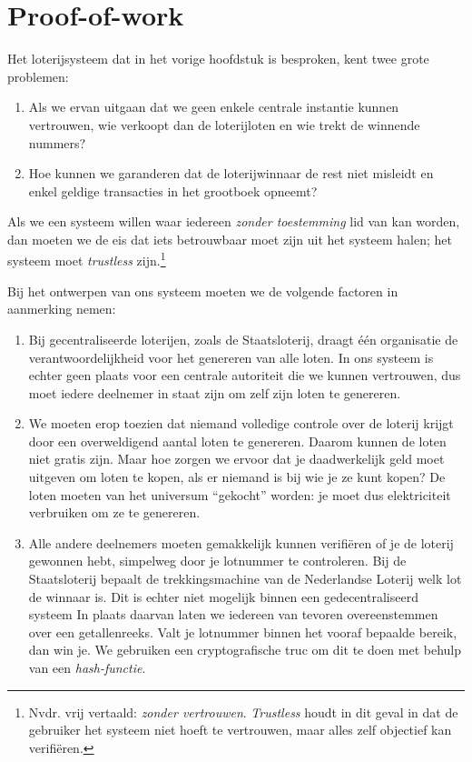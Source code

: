 
\chapter{Proof-of-work}

Het loterijsysteem dat in het vorige hoofdstuk is besproken, kent twee grote problemen:

\begin{enumerate}
    \item Als we ervan uitgaan dat we geen enkele centrale instantie kunnen vertrouwen, wie verkoopt dan de loterijloten en wie trekt de winnende nummers?
    \item Hoe kunnen we garanderen dat de loterijwinnaar de rest niet misleidt en enkel geldige transacties in het grootboek opneemt?
\end{enumerate}

Als we een systeem willen waar iedereen \textit{zonder toestemming} lid van kan worden, dan moeten we de eis dat iets betrouwbaar moet zijn uit het systeem halen; het systeem moet \textit{trustless} zijn.\footnote{Nvdr. vrij vertaald: \textit{zonder vertrouwen}. \textit{Trustless} houdt in dit geval in dat de gebruiker het systeem niet hoeft te vertrouwen, maar alles zelf objectief kan verifiëren.} 

Bij het ontwerpen van ons systeem moeten we de volgende factoren in aanmerking nemen:

\begin{enumerate}
    \item Bij gecentraliseerde loterijen, zoals de Staatsloterij, draagt één organisatie de verantwoordelijkheid voor het genereren van alle loten. In ons systeem is echter geen plaats voor een centrale autoriteit die we kunnen vertrouwen, dus moet iedere deelnemer in staat zijn om zelf zijn loten te genereren.
    \item  	We moeten erop toezien dat niemand volledige controle over de loterij krijgt door een overweldigend aantal loten te genereren. Daarom kunnen de loten niet gratis zijn. Maar hoe zorgen we ervoor dat je daadwerkelijk geld moet uitgeven om loten te kopen, als er niemand is bij wie je ze kunt kopen? De loten moeten van het universum ``gekocht'' worden: je moet dus elektriciteit verbruiken om ze te genereren.
    \item  	Alle andere deelnemers moeten gemakkelijk kunnen verifiëren of je de loterij gewonnen hebt, simpelweg door je lotnummer te controleren. Bij de Staatsloterij bepaalt de trekkingsmachine van de Nederlandse Loterij welk lot de winnaar is. Dit is echter niet mogelijk binnen een gedecentraliseerd systeem In plaats daarvan laten we iedereen van tevoren overeenstemmen over een getallenreeks. Valt je lotnummer binnen het vooraf bepaalde bereik, dan win je. We gebruiken een cryptografische truc om dit te doen met behulp van een \textit{hash-functie}.
\end{enumerate}

